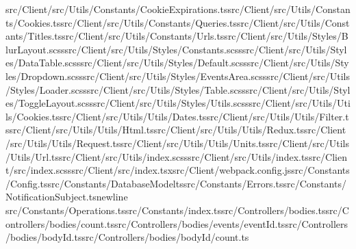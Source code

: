\documentclass[a4paper,12pt]{article}
\begin{document}
src/Client/src/Utils/Constants/CookieExpirations.ts\newline src/Client/src/Utils/Constants/Cookies.ts\newline src/Client/src/Utils/Constants/Queries.ts\newline src/Client/src/Utils/Constants/Titles.ts\newline src/Client/src/Utils/Constants/Urls.ts\newline src/Client/src/Utils/Styles/BlurLayout.scss\newline src/Client/src/Utils/Styles/Constants.scss\newline src/Client/src/Utils/Styles/DataTable.scss\newline src/Client/src/Utils/Styles/Default.scss\newline src/Client/src/Utils/Styles/Dropdown.scss\newline src/Client/src/Utils/Styles/EventsArea.scss\newline src/Client/src/Utils/Styles/Loader.scss\newline src/Client/src/Utils/Styles/Table.scss\newline src/Client/src/Utils/Styles/ToggleLayout.scss\newline src/Client/src/Utils/Styles/Utils.scss\newline src/Client/src/Utils/Utils/Cookies.ts\newline src/Client/src/Utils/Utils/Dates.ts\newline src/Client/src/Utils/Utils/Filter.ts\newline src/Client/src/Utils/Utils/Html.ts\newline src/Client/src/Utils/Utils/Redux.ts\newline src/Client/src/Utils/Utils/Request.ts\newline src/Client/src/Utils/Utils/Units.ts\newline src/Client/src/Utils/Utils/Url.ts\newline src/Client/src/Utils/index.scss\newline src/Client/src/Utils/index.ts\newline src/Client/src/index.scss\newline src/Client/src/index.tsx\newline src/Client/webpack.config.js\newline src/Constants/Config.ts\newline src/Constants/DatabaseModelts\newline src/Constants/Errors.ts\newline src/Constants/NotificationSubject.tsnewline src/Constants/Operations.ts\newline src/Constants/index.ts\newline src/Controllers/bodies.ts\newline src/Controllers/bodies/count.ts\newline src/Controllers/bodies/events/{eventId}.ts\newline src/Controllers/bodies/{bodyId}.ts\newline src/Controllers/bodies/{bodyId}/count.ts\newline 
\end{document}
